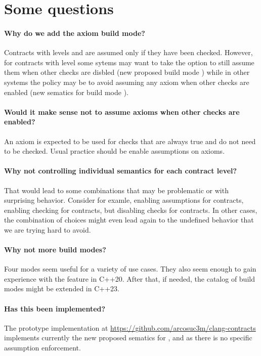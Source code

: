 \section{Some questions}

\paragraph{Why do we add the axiom build mode?}
Contracts with levels  and  are assumed only
if they have been checked. However, for contracts with level 
some sytems may want to take the option to still assume them when other checks
are disbled (new proposed build mode ) while in other
systems the policy may be to avoid assuming any axiom when other checks are
enabled (new sematics for build mode ).

\paragraph{Would it make sense not to assume axioms when other checks are
enabled?}
An axiom is expected to be used for checks that are always true and do not need to
be checked. Usual practice should be enable assumptions on axioms.

\paragraph{Why not controlling individual semantics for each contract level?}
That would lead to some combinations that may be problematic or with surprising
behavior. Consider for examle, enabling assumptions for  contracts, enabling
checking for  contracts, but disabling checks for 
contracts. In other cases, the combination of choices might even lead again to
the undefined behavior that we are trying hard to avoid.

\paragraph{Why not more build modes?}
Four modes seem useful for a variety of use cases. They also seem enough to gain
experience with the feature in C++20. After that, if needed, the catalog of
build modes might be extended in C++23.

\paragraph{Has this been implemented?}
The prototype implementation at
\url{https://github.com/arcosuc3m/clang-contracts} implements currently the new
proposed sematics for ,  and  as there
is no specific assumption enforcement.
